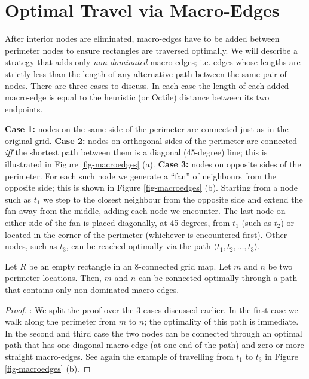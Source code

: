 \section{Optimal Travel via Macro-Edges}
After interior nodes are eliminated, macro-edges have to be added between perimeter
nodes to ensure rectangles are traversed optimally.
We will describe a strategy that adds only \emph{non-dominated} macro edges; i.e. edges whose 
lengths are strictly less than the length of any alternative path between the same pair of nodes.
There are three cases to discuss. In each case the length of each added macro-edge 
is equal to the heuristic (or Octile) distance between its two endpoints.
\par 
\textbf{Case 1:} nodes on the same side of the perimeter are connected
just as in the original grid.
\textbf{Case 2:} nodes on orthogonal sides of the perimeter are connected \emph{iff} the shortest path between them is a diagonal
(45-degree) line; this is illustrated in Figure \ref{fig-macroedges} (a).
\textbf{Case 3:} nodes on opposite sides of the perimeter. 
For each such node we generate a ``fan'' of neighbours from the opposite side; this is shown in Figure
\ref{fig-macroedges} (b).
Starting from a node such as $t_{1}$ we step to the closest
neighbour from the opposite side and extend the fan away
from the middle, adding each node we encounter.  The last node
on either side of the fan is placed diagonally, at 45 degrees, from $t_{1}$
(such as $t_{2}$) or located in the corner of the perimeter (whichever is encountered first).  
Other nodes, such as $t_{3}$, can be reached optimally via the path $\langle t_1, t_2, \dots,
t_3 \rangle $.

\begin{lemma} \label{lemma-rooms} Let $R$ be an empty rectangle in
an 8-connected grid map. Let $m$ and $n$ be two perimeter locations.
Then, $m$ and $n$ can be connected optimally through a path that
contains only non-dominated macro-edges.
\end{lemma}

\begin{proof}:
We split the proof over the 3 cases discussed earlier.
In the first case we walk along the perimeter from $m$ to $n$; the
optimality of this path is immediate. In the second and third case 
the two nodes can be connected through an optimal path that has one diagonal macro-edge
(at one end of the path) and zero or more straight macro-edges.
See again the example of travelling from $t_1$ to $t_3$ in Figure
\ref{fig-macroedges} (b).
\end{proof}

